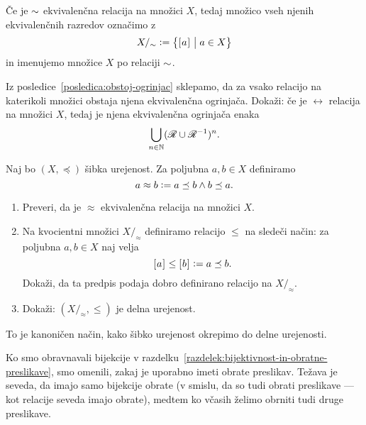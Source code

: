                 Če je $\sim$ ekvivalenčna relacija na množici $X$, tedaj množico vseh njenih ekvivalenčnih razredov označimo z
                \[X/_\equ \dfeq \set[1]{\ec{a}}{a \in X}\]
                in imenujemo  množice $X$ po relaciji $\sim$.


                \begin{vaja}
                        Iz posledice~\ref{posledica:obstoj-ogrinjac} sklepamo, da za vsako relacijo na katerikoli množici obstaja njena ekvivalenčna ogrinjača. Dokaži: če je $\rel$ relacija na množici $X$, tedaj je njena ekvivalenčna ogrinjača enaka
                        \[\bigcup_{n \in \NN} (\rel \cup \rel^{-1})^n.\]
                \end{vaja}

                \begin{vaja}
                        Naj bo $(X, \preceq)$ šibka urejenost. Za poljubna $a, b \in X$ definiramo
                        \[a \approx b \mathrel{\mathop:}= a \preceq b \land b \preceq a.\]
                        \begin{enumerate}
                                \item
                                        Preveri, da je $\approx$ ekvivalenčna relacija na množici $X$.
                                \item
                                        Na kvocientni množici $X/_\approx$ definiramo relacijo $\leq$ na sledeči način: za poljubna $a, b \in X$ naj velja
                                        \[[\:\!{a}\:\!]_{} \leq [\:\!{b}\:\!]_{} \mathrel{\mathop:}= a \preceq b.\]
                                        Dokaži, da ta predpis podaja dobro definirano relacijo na $X/_\approx$.
                                \item
                                        Dokaži: $(X/_\approx, \leq)$ je delna urejenost.
                        \end{enumerate}
                        To je kanoničen način, kako šibko urejenost okrepimo do delne urejenosti.
                \end{vaja}


                Ko smo obravnavali bijekcije v razdelku~\ref{razdelek:bijektivnost-in-obratne-preslikave}, smo omenili, zakaj je uporabno imeti obrate preslikav. Težava je seveda, da imajo samo bijekcije obrate (v smislu, da so tudi obrati preslikave --- kot relacije seveda imajo obrate), medtem ko včasih želimo obrniti tudi druge preslikave.

